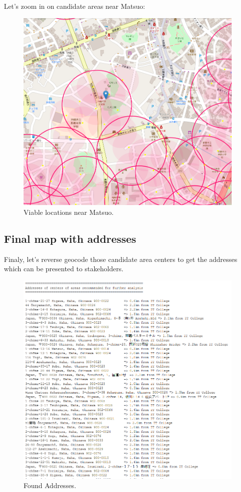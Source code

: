 \documentclass[11pt]{article}
\begin{document}
Let's zoom in on candidate areas near Matsuo:

\begin{figure}[H]
    \centering
        \includegraphics[scale=.4]{figures/cm14.png}
    \caption{ Viable locations near Matsuo.}
    \label{fig:1}
\end{figure}

\subsection{Final map with addresses}

Finaly, let's reverse geocode those candidate area centers to get the addresses which can be presented to stakeholders.

\begin{figure}[H]
    \centering
        \includegraphics[scale=.6]{figures/cm16.png}
    \caption{ Found Addresses.}
    \label{fig:1}
\end{figure}
\end{document}
